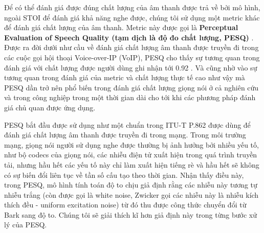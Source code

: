 		
		Để có thể đánh giá được đúng chất lượng của âm thanh được trả về bởi mô hình, ngoài STOI để đánh giá khả năng nghe được, chúng tôi sử dụng một metric khác để đánh giá chất lượng của âm thanh. Metric này được gọi là \textbf{Perceptual Evaluation of Speech Quality (tạm dịch là độ đo chất lượng, PESQ)} \cite{pesq}. Được ra đời dưới như cầu về đánh giá chất lượng âm thanh được truyền đi trong các cuộc gọi hội thoại Voice-over-IP (VoIP), PESQ cho thấy sự tương quan trong đánh giá với chất lượng được người dùng ghi nhận tới 0.92 \cite{pesq}. Và cũng nhờ vào sự tương quan trong đánh giá của metric và chất lượng thực tế cao như vậy mà PESQ dần trở nên phổ biến trong đánh giá chất lượng giọng nói ở cả nghiên cứu và trong công nghiệp trong một thời gian dài cho tới khi các phương pháp đánh giá chủ quan được ứng dụng.
		
		PESQ bắt đầu được sử dụng như một chuẩn trong ITU-T P.862 được dùng để đánh giá chất lượng âm thanh được truyền đi trong mạng. Trong môi trường mạng, giọng nói người sử dụng nghe được thường bị ảnh hưởng bởi nhiều yếu tố, như bộ codecs của giọng nói, các nhiễu điện tử xuất hiện trong quá trình truyền tải, nhưng hầu hết các yếu tố này chỉ làm xuất hiện tiếng rè và hầu hết sẽ không có sự biến đổi liên tục về tần số cấu tạo theo thời gian. Nhận thấy điều này, trong PESQ, mô hình tính toán độ to chịu giả định rằng các nhiễu này tương tự nhiễu trắng (còn được gọi là white noise, Zwicker gọi các nhiễu này là nhiễu kích thích đều - uniform excitation noise) từ đó thu được công thức chuyển đổi từ Bark \spectrogram{} sang \spectrogram{} độ to. Chúng tôi sẽ giải thích kĩ hơn giả định này trong từng bước xử lý của PESQ.
		
